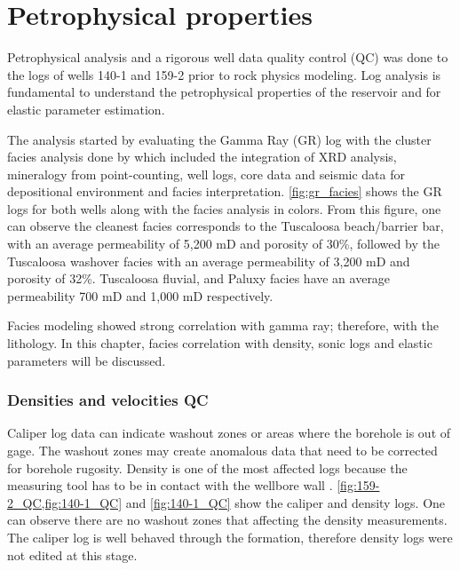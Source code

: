 \chapter{Petrophysical properties}


Petrophysical analysis and a rigorous well data quality control (QC)
was done to the logs of wells 140-1 and 159-2 prior to rock physics modeling.
Log analysis is fundamental to understand the petrophysical
properties of the reservoir and for elastic 
parameter estimation.

The analysis started by evaluating the Gamma Ray (GR) log with the cluster
facies analysis done by \cite{ref:doug} which included the integration 
of XRD analysis, mineralogy from point-counting, well logs, core data and seismic data
for depositional environment and facies interpretation. \ref{fig:gr_facies} shows
the GR logs for both wells along with the facies analysis in colors. From this figure, one can 
observe the cleanest facies corresponds to the Tuscaloosa beach/barrier bar, with an
average permeability of 5,200 mD and porosity of 30\%, followed by the Tuscaloosa washover
facies with an average permeability of 3,200 mD and porosity of 32\%. Tuscaloosa fluvial,
and Paluxy facies have an average permeability 700 mD and 1,000 mD respectively. 

Facies modeling showed strong correlation with gamma ray;
therefore, with the lithology. In this chapter, facies
correlation with density, sonic logs and elastic parameters
will be discussed.  


 

\subsection{Densities and velocities QC}

Caliper log data can indicate washout zones or areas where the borehole is out
of gage. The washout zones may create
anomalous data that need to be corrected for borehole rugosity. Density is one
 of the most affected logs because the measuring tool has to be in contact with 
the wellbore wall \citep{ref:tad}. 
\ref{fig:159-2_QC,fig:140-1_QC} and \ref{fig:140-1_QC} show the caliper and density logs. One can observe there are no washout zones that affecting the density measurements. 
The caliper log is well behaved through the formation, therefore density logs were
 not edited at this stage.



